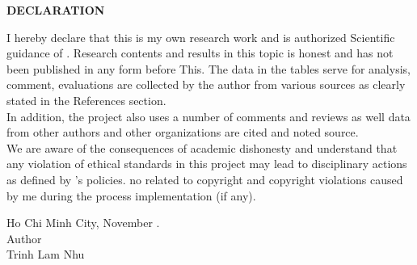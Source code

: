 \begin{center}
 \Large {\bf \uppercase{DECLARATION}}
\end{center}

\vspace{1\baselineskip}

\noindent I hereby declare that this is my own research work and is authorized
Scientific guidance of \gvhd. Research contents and results
in this topic is honest and has not been published in any form before
This. The data in the tables serve for analysis, comment,
evaluations are collected by the author from various sources as clearly stated in the References section. \\

\noindent In addition, the project also uses a number of comments and reviews as well data from other authors and other organizations are cited and noted
source. \\

\noindent We are aware of the consequences of academic dishonesty and understand that any violation of ethical standards in this project may lead to disciplinary actions as defined by \university's policies. \university no related to copyright and copyright violations caused by me during the process implementation (if any).
\begin{center}
	\hspace*{7cm}Ho Chi Minh City, November  \nam.\\
	\hspace*{7cm}Author\\
	\vspace*{0.2cm}
	\vspace*{2cm}
	\hspace*{7cm}Trinh Lam Nhu
\end{center}